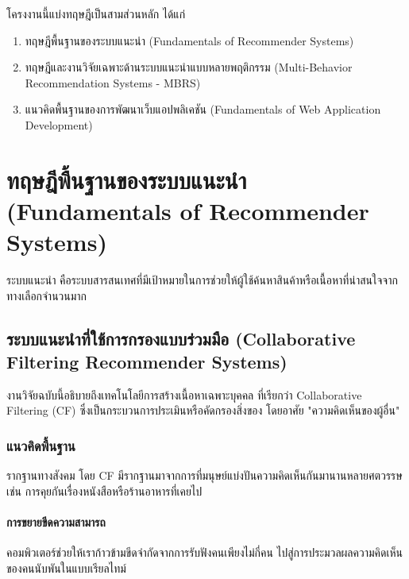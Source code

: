 
\noindent โครงงานนี้แบ่งทฤษฎีเป็นสามส่วนหลัก ได้แก่

\begin{enumerate}[label=\arabic*), leftmargin=3em, labelsep=0.5em, itemsep=0.5ex]
    \item ทฤษฎีพื้นฐานของระบบแนะนำ (Fundamentals of Recommender Systems)
    \item ทฤษฎีและงานวิจัยเฉพาะด้านระบบแนะนำแบบหลายพฤติกรรม (Multi-Behavior Recommendation Systems - MBRS)
    \item แนวคิดพื้นฐานของการพัฒนาเว็บแอปพลิเคชัน (Fundamentals of Web Application Development)
\end{enumerate}

\section{ทฤษฎีพื้นฐานของระบบแนะนำ (Fundamentals of Recommender Systems)}
ระบบแนะนำ คือระบบสารสนเทศที่มีเป้าหมายในการช่วยให้ผู้ใช้ค้นหาสินค้าหรือเนื้อหาที่น่าสนใจจากทางเลือกจำนวนมาก \cite{resnick1997}

\subsection{ระบบแนะนำที่ใช้การกรองแบบร่วมมือ (Collaborative Filtering Recommender Systems)}

งานวิจัยฉบับนี้อธิบายถึงเทคโนโลยีการสร้างเนื้อหาเฉพาะบุคคล ที่เรียกว่า Collaborative Filtering (CF) ซึ่งเป็นกระบวนการประเมินหรือคัดกรองสิ่งของ โดยอาศัย "ความคิดเห็นของผู้อื่น" \cite{cfrs_nd}

\subsubsection{แนวคิดพื้นฐาน}

รากฐานทางสังคม โดย CF มีรากฐานมาจากการที่มนุษย์แบ่งปันความคิดเห็นกันมานานหลายศตวรรษ เช่น การคุยกันเรื่องหนังสือหรือร้านอาหารที่เคยไป \cite{cfrs_nd}

\paragraph{การขยายขีดความสามารถ} คอมพิวเตอร์ช่วยให้เราก้าวข้ามขีดจำกัดจากการรับฟังคนเพียงไม่กี่คน ไปสู่การประมวลผลความคิดเห็นของคนนับพันในแบบเรียลไทม์

